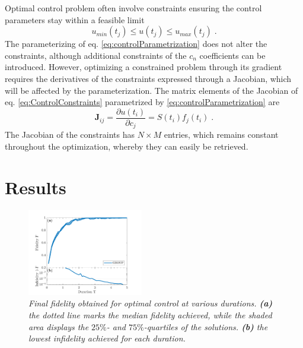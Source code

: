 \documentclass[%
 reprint,
 amsmath,amssymb,
 aps,
pra,
]{revtex4-1}
\begin{document}
Optimal control problem often involve constraints ensuring the control parameters stay within a feasible limit
\begin{equation}
	 u_{min} (t_j) \leq u(t_j) \leq u_{max} (t_j) \; .
	 \label{eq:ControlConstraints}
\end{equation}
The parameterizing of eq. \eqref{eq:controlParametrization} does not alter the constraints, although additional constraints of the $c_n$ coefficients can be introduced. However, optimizing a constrained problem through its gradient requires the derivatives of the constraints expressed through a Jacobian, which will be affected by the parameterization. The matrix elements of the Jacobian of eq. \eqref{eq:ControlConstraints} parametrized by \eqref{eq:controlParametrization} are
\begin{equation}
	\boldsymbol{J}_{ij} = \frac{\partial u(t_i)}{\partial c_j} = S(t_i) f_j (t_i) \; . \label{eq:ConstraintJacobian}
\end{equation}
The Jacobian of the constraints has $N \times M$ entries, which remains constant throughout the optimization, whereby they can easily be retrieved.
  

\section{Results}


\begin{figure}[h!]
    \centering
    \includegraphics[width=0.45\textwidth]{Figures/FidelityDuration.pdf}
    \caption{\textit{Final fidelity obtained for optimal control at various durations. \textbf{(a)} the dotted line marks the median fidelity achieved, while the shaded area displays the $25\%$- and $75\%$-quartiles of the solutions. \textbf{(b)} the lowest infidelity achieved for each duration. }}
    \label{fig:FidelityDuration}
\end{figure}
\end{document}
